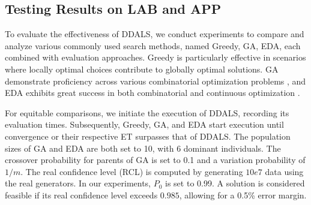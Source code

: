\documentclass[lettersize,journal]{IEEEtran}
\begin{document}
\subsection{Testing Results on LAB and APP}
To evaluate the effectiveness of DDALS, we conduct experiments to compare and analyze various commonly used search methods, named Greedy, GA, EDA, each combined with evaluation approaches. 
Greedy is particularly effective in scenarios where locally optimal choices contribute to globally optimal solutions.
GA demonstrate proficiency across various combinatorial optimization problems \cite{TangLYY21,LIUTY2021,LiuZTY23}, and EDA exhibits great success in both combinatorial and continuous optimization \cite{6899662}. 
 
For equitable comparisons, we initiate the execution of DDALS, recording its evaluation times. 
Subsequently, Greedy, GA, and EDA start execution until convergence or their respective ET surpasses that of DDALS.  
The population sizes of GA and EDA are both set to 10, with 6 dominant individuals. 
The crossover probability for parents of GA is set to 0.1 and a variation probability of $1/m$.  
The real confidence level (RCL) is computed by generating $10e7$ data using the real generators. 
In our experiments, $P_0$ is set to 0.99. 
A solution is considered feasible if its real confidence level exceeds $0.985$, allowing for a 0.5\% error margin.
\end{document}
